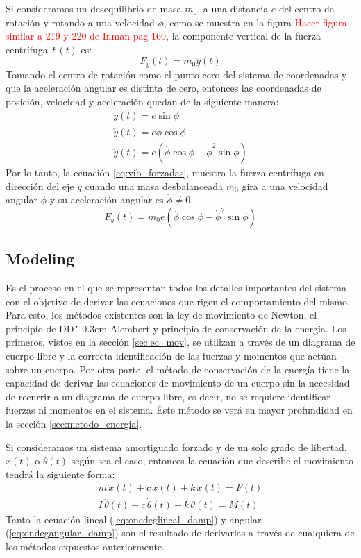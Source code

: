 Si consideramos un desequilibrio de masa $m_0$, a una distancia $e$ del centro de rotación y rotando a una velocidad $\phi$, como se muestra en la figura \textcolor{red}{Hacer figura similar a 219 y 220 de Inman pag 160}, la componente vertical de la fuerza centrífuga $F(t)$ es:
\begin{equation}
	F_y(t) = m_0\ddot{y}(t)
\end{equation}
Tomando el centro de rotación como el punto cero del sistema de coordenadas y que la aceleración angular es distinta de cero, entonces las coordenadas de posición, velocidad y aceleración quedan de la siguiente manera:
\begin{gather*}
	y(t) = e \sin \phi\\
	\dot{y}(t) = e \dot{\phi}\cos \phi\\
	\ddot{y}(t) = e(\ddot{\phi}\cos\phi - \dot{\phi}^2\sin\phi)
\end{gather*}
Por lo tanto, la ecuación \ref{eq:vib_forzadas}, muestra la fuerza centrífuga en dirección del eje $y$ cuando una masa desbalanceada $m_0$ gira a una velocidad angular $\dot{\phi}$ y su aceleración angular es $\ddot{\phi} \neq 0$.
\begin{equation}\label{eq:vib_forzadas}
	F_y(t) = m_0e(\ddot{\phi}\cos\phi- \dot{\phi}^2\sin\phi)
\end{equation}

\subsection{Modeling}
Es el proceso en el que se representan todos los detalles importantes del sistema con el objetivo de derivar las ecuaciones que  rigen el comportamiento del mismo. Para esto, los métodos existentes son la ley de movimiento de Newton, el principio de DD\texttt{'}\kern-0.3em Alembert y principio de conservación de la energía. Los primeros, vistos en la sección \ref{sec:ec_mov}, se utilizan a través de un diagrama de cuerpo libre y la correcta identificación de las fuerzas y momentos que actúan sobre un cuerpo. Por otra parte, el método de conservación de la energía tiene la capacidad de derivar las ecuaciones de movimiento de un cuerpo sin la necesidad de recurrir a un diagrama de cuerpo libre, es decir, no se requiere identificar fuerzas ni momentos en el sistema. Éste método se verá en mayor profundidad en la sección \ref{sec:metodo_energia}.

Si consideramos un sistema amortiguado forzado y de un solo grado de libertad, $x(t)$ o $\theta(t)$ según sea el caso, entonces la ecuación que describe el movimiento tendrá la siguiente forma:
\begin{subequations}
\begin{align}
	m\,\ddot{x}(t) + c\,\dot{x}(t) + k\,x(t) = F(t) \label{eq:onedeglineal_damp}\\
	I\,\ddot{\theta}(t) + c\,\dot{\theta}(t) + k\,\theta(t) = M(t) \label{eq:ondegangular_damp}
\end{align}
\end{subequations}
Tanto la ecuación lineal (\ref{eq:onedeglineal_damp}) y angular (\ref{eq:ondegangular_damp}) son el resultado de derivarlas a través de cualquiera de los métodos expuestos anteriormente.  
 
